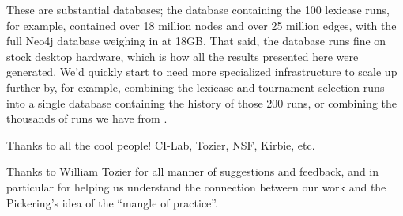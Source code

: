 These are substantial
databases; the database containing the 100 lexicase runs, for example, contained over 18 million nodes and over 25
million edges, with the full Neo4j database weighing in at 18GB. That said, the database runs fine on stock desktop 
hardware, which is how all the results presented here were generated. We'd quickly start to need more specialized
infrastructure to scale up further by, for example, combining the 
lexicase and tournament selection runs into a single database containing the history of those 200 runs, or combining
the thousands of runs we have from \citep{Helmuth:2015:GPTP}.

\begin{acknowledgement}
	Thanks to all the cool people! CI-Lab, Tozier, NSF, Kirbie, etc.
	
	Thanks to William Tozier for all manner of suggestions and feedback, and in particular for helping us understand
	the connection between our work and the Pickering's idea of the ``mangle of practice''.
\end{acknowledgement}



